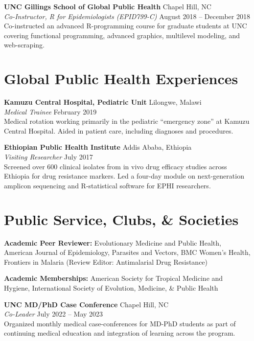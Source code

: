 \documentclass[11pt,letterpaper]{article}
\newcommand{\entry}[4]{%
  \textbf{#1} \hfill #2 \\
  \textit{#3} \hfill #4 \\[2pt]
}
\begin{document}
\entry{UNC Gillings School of Global Public Health}{Chapel Hill, NC}{Co-Instructor, R for Epidemiologists (EPID799-C)}{August 2018 -- December 2018}
Co-instructed an advanced R-programming course for graduate students at UNC covering functional programming, advanced graphics, multilevel modeling, and web-scraping.

\vspace{18pt}

\section{Global Public Health Experiences}

\entry{Kamuzu Central Hospital, Pediatric Unit}{Lilongwe, Malawi}{Medical Trainee}{February 2019}
Medical rotation working primarily in the pediatric ``emergency zone'' at Kamuzu Central Hospital. Aided in patient care, including diagnoses and procedures.

\vspace{12pt}

\entry{Ethiopian Public Health Institute}{Addis Ababa, Ethiopia}{Visiting Researcher}{July 2017}
Screened over 600 clinical isolates from in vivo drug efficacy studies across Ethiopia for drug resistance markers. Led a four-day module on next-generation amplicon sequencing and R-statistical software for EPHI researchers.

\vspace{18pt}

\section{Public Service, Clubs, \& Societies}

\textbf{Academic Peer Reviewer:} Evolutionary Medicine and Public Health, American Journal of Epidemiology, Parasites and Vectors, BMC Women's Health, Frontiers in Malaria (Review Editor: Antimalarial Drug Resistance)

\textbf{Academic Memberships:} American Society for Tropical Medicine and Hygiene, International Society of Evolution, Medicine, \& Public Health

\vspace{6pt}

\entry{UNC MD/PhD Case Conference}{Chapel Hill, NC}{Co-Leader}{July 2022 -- May 2023}
Organized monthly medical case-conferences for MD-PhD students as part of continuing medical education and integration of learning across the program.
\end{document}
